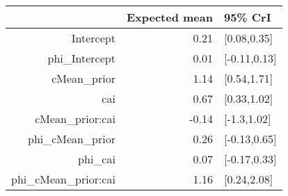 \begin{tabular}{rrl}
  \hline
 & Expected mean & 95\% CrI \\ 
  \hline
Intercept & 0.21 & [0.08,0.35] \\ 
  phi\_Intercept & 0.01 & [-0.11,0.13] \\ 
  cMean\_prior & 1.14 & [0.54,1.71] \\ 
  cai & 0.67 & [0.33,1.02] \\ 
  cMean\_prior:cai & -0.14 & [-1.3,1.02] \\ 
  phi\_cMean\_prior & 0.26 & [-0.13,0.65] \\ 
  phi\_cai & 0.07 & [-0.17,0.33] \\ 
  phi\_cMean\_prior:cai & 1.16 & [0.24,2.08] \\ 
   \hline
\end{tabular}

